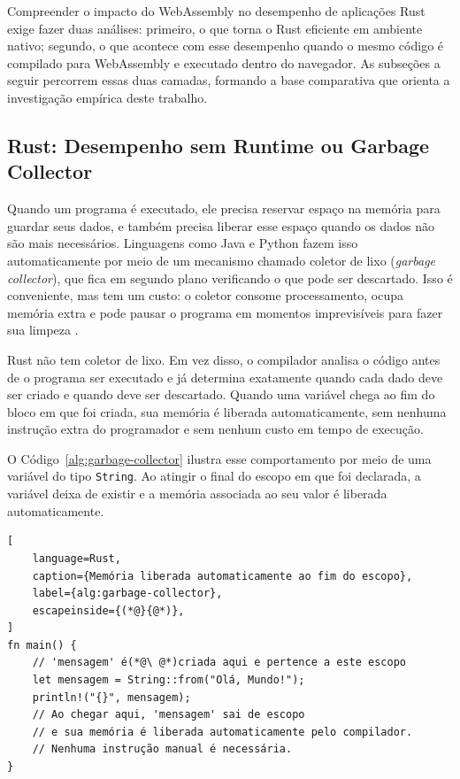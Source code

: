 Compreender o impacto do WebAssembly no desempenho de aplicações Rust exige fazer duas análises: primeiro, o que torna o Rust eficiente em ambiente nativo; segundo, o que acontece com esse desempenho quando o mesmo código é compilado para WebAssembly e executado dentro do navegador. As subseções a seguir percorrem essas duas camadas, formando a base comparativa que orienta a investigação empírica deste trabalho.

\subsection{Rust: Desempenho sem Runtime ou Garbage Collector}
Quando um programa é executado, ele precisa reservar espaço na memória para guardar seus dados, e também precisa liberar esse espaço quando os dados não são mais necessários. Linguagens como Java e Python fazem isso automaticamente por meio de um mecanismo chamado coletor de lixo (\emph{garbage collector}), que fica em segundo plano verificando o que pode ser descartado. Isso é conveniente, mas tem um custo: o coletor consome processamento, ocupa memória extra e pode pausar o programa em momentos imprevisíveis para fazer sua limpeza \cite{bugden2022}.

Rust não tem coletor de lixo. Em vez disso, o compilador analisa o código antes de o programa ser executado e já determina exatamente quando cada dado deve ser criado e quando deve ser descartado. Quando uma variável chega ao fim do bloco em que foi criada, sua memória é liberada automaticamente, sem nenhuma instrução extra do programador e sem nenhum custo em tempo de execução.

O Código~\ref{alg:garbage-collector} ilustra esse comportamento por meio de uma variável do tipo \texttt{String}. Ao atingir o final do escopo em que foi declarada, a variável deixa de existir e a memória associada ao seu valor é liberada automaticamente.

\begin{lstlisting}[
    language=Rust,
    caption={Memória liberada automaticamente ao fim do escopo},
    label={alg:garbage-collector},
    escapeinside={(*@}{@*)},
]
fn main() {
    // 'mensagem' é(*@\ @*)criada aqui e pertence a este escopo
    let mensagem = String::from("Olá, Mundo!");
    println!("{}", mensagem);
    // Ao chegar aqui, 'mensagem' sai de escopo
    // e sua memória é liberada automaticamente pelo compilador.
    // Nenhuma instrução manual é necessária.
}
\end{lstlisting}

